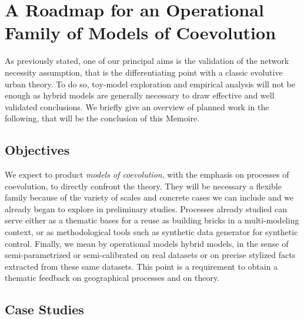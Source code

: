 



\chapter{A Roadmap for an Operational Family of Models of Coevolution} %

\label{ch:operational} 


As previously stated, one of our principal aims is the validation of the network necessity assumption, that is the differentiating point with a classic evolutive urban theory. To do so, toy-model exploration and empirical analysis will not be enough as hybrid models are generally necessary to draw effective and well validated conclusions. We briefly give an overview of planned work in the following, that will be the conclusion of this Memoire.






\section{Objectives}


We expect to product \emph{models of coevolution}, with the emphasis on processes of coevolution, to directly confront the theory. They will be necessary a flexible family because of the variety of scales and concrete cases we can include and we already began to explore in preliminary studies. Processes already studied can serve either as a thematic bases for a reuse as building bricks in a multi-modeling context, or as methodological tools such as synthetic data generator for synthetic control. Finally, we mean by operational models hybrid models, in the sense of semi-parametrized or semi-calibrated on real datasets or on precise stylized facts extracted from these same datasets. This point is a requirement to obtain a thematic feedback on geographical processes and on theory.



\section{Case Studies}

